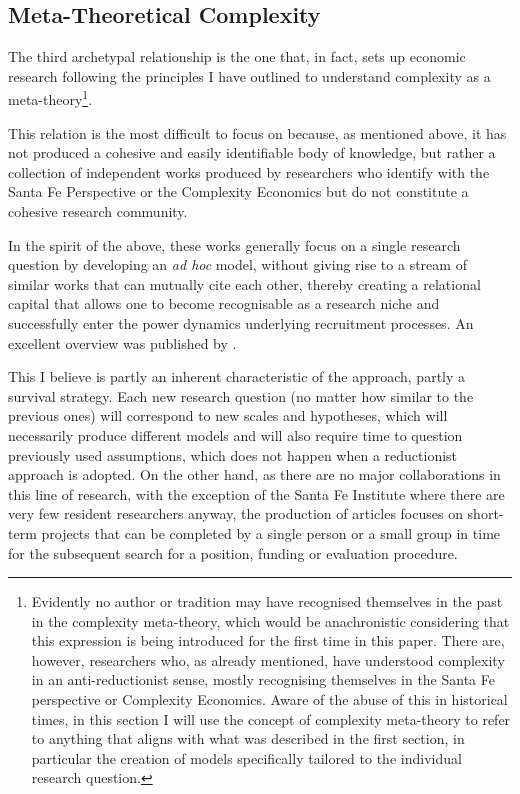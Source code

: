 \subsection{Meta-Theoretical Complexity}
The third archetypal relationship is the one that, in fact, sets up economic research following the principles I have outlined to understand complexity as a meta-theory\footnote{Evidently no author or tradition may have recognised themselves in the past in the complexity meta-theory, which would be anachronistic considering that this expression is being introduced for the first time in this paper. There are, however, researchers who, as already mentioned, have understood complexity in an anti-reductionist sense, mostly recognising themselves in the Santa Fe perspective or Complexity Economics. Aware of the abuse of this in historical times, in this section I will use the concept of complexity meta-theory to refer to anything that aligns with what was described in the first section, in particular the creation of models specifically tailored to the individual research question.}.

This relation is the most difficult to focus on because, as mentioned above, it has not produced a cohesive and easily identifiable body of knowledge, but rather a collection of independent works produced by researchers who identify with the Santa Fe Perspective or the Complexity Economics but do not constitute a cohesive research community.

In the spirit of the above, these works generally focus on a single research question by developing an \textit{ad hoc} model, without giving rise to a stream of similar works that can mutually cite each other, thereby creating a relational capital that allows one to become recognisable as a research niche and successfully enter the power dynamics underlying recruitment processes. An excellent overview was published by \textcite{arthur2021}.

This I believe is partly an inherent characteristic of the approach, partly a survival strategy.
Each new research question (no matter how similar to the previous ones) will correspond to new scales and hypotheses, which will necessarily produce different models and will also require time to question previously used assumptions, which does not happen when a reductionist approach is adopted.
On the other hand, as there are no major collaborations in this line of research, with the exception of the Santa Fe Institute where there are very few resident researchers anyway, the production of articles focuses on short-term projects that can be completed by a single person or a small group in time for the subsequent search for a position, funding or evaluation procedure.

